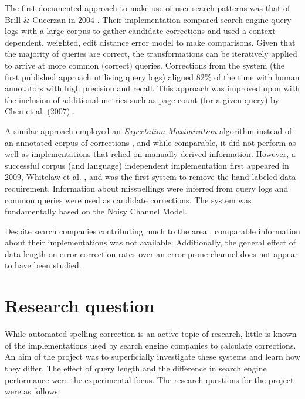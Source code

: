 \documentclass{csfourzero}
\begin{document}
The first documented approach to make use of user search patterns was that of Brill \& Cucerzan in 2004 \cite{webuserpoweredspelling}. Their implementation compared search engine query logs with a large corpus to gather candidate corrections and used a context-dependent, weighted, edit distance error model to make comparisons. Given that the majority of queries are correct, the transformations can be iteratively applied to arrive at more common (correct) queries. Corrections from the system (the first published approach utilising query logs) aligned 82\% of the time with human annotators with high precision and recall. This approach was improved upon with the inclusion of additional metrics such as page count (for a given query) by Chen et al. (2007) \cite{webuser3}.

A similar approach employed an \textit{Expectation Maximization} algorithm instead of an annotated corpus of corrections \cite{webuser2learningerrormodel}, and while comparable, it did not perform as well as implementations that relied on manually derived information. However, a successful corpus (and language) independent implementation first appeared in 2009, Whitelaw et al. \cite{webuser4google2009}, and was the first system to remove the hand-labeled data requirement. Information about misspellings were inferred from query logs and common queries were used as candidate corrections. The system was fundamentally based on the Noisy Channel Model.

Despite search companies contributing much to the area \cite{webuser3, webuserpoweredspelling, microranker, microphone, webuser4google2009}, comparable information about their implementations was not available. Additionally, the general effect of data length on error correction rates over an error prone channel does not appear to have been studied.

\section{Research question}
\label{sec:rq}

While automated spelling correction is an active topic of research, little is known of the implementations used by search engine companies to calculate corrections. An aim of the project was to superficially investigate these systems and learn how they differ. The effect of query length and the difference in search engine performance were the experimental focus. The research questions for the project were as follows:
\end{document}
